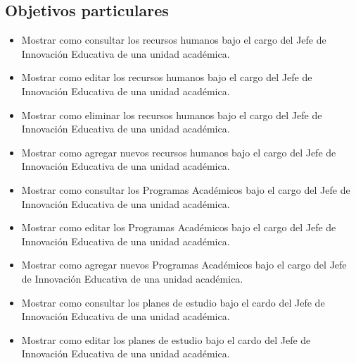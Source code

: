     \subsection{Objetivos particulares}
    \begin{itemize}
        \item Mostrar como consultar los recursos humanos bajo el cargo del Jefe de Innovación Educativa de una unidad académica.
        \item Mostrar como editar los recursos humanos bajo el cargo del Jefe de Innovación Educativa de una unidad académica.
        \item Mostrar como eliminar los recursos humanos bajo el cargo del Jefe de Innovación Educativa de una unidad académica.
        \item Mostrar como agregar nuevos recursos humanos bajo el cargo del Jefe de Innovación Educativa de una unidad académica.
         \item Mostrar como consultar los Programas Académicos bajo el cargo del Jefe de Innovación Educativa de una unidad académica.
        \item Mostrar como editar los Programas Académicos bajo el cargo del Jefe de Innovación Educativa de una unidad académica.
        \item Mostrar como agregar nuevos Programas Académicos bajo el cargo del Jefe de Innovación Educativa de una unidad académica.
        \item Mostrar como consultar los planes de estudio bajo el cardo del Jefe de Innovación Educativa de una unidad académica.
        \item Mostrar como editar los planes de estudio bajo el cardo del Jefe de Innovación Educativa de una unidad académica.

    \end{itemize}
